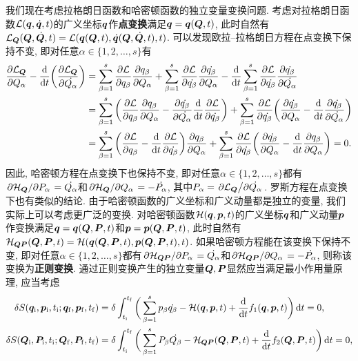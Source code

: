 我们现在考虑拉格朗日函数和哈密顿函数的独立变量变换问题. 考虑对拉格朗日函数$ \mathcal{L}(\vb*{q},\dot{\vb*{q}},t) $的广义坐标$ \vb*{q} $作\textbf{点变换}满足$ \vb*{q}=\vb*{q}(\vb*{Q},t) $, 此时自然有$ \mathcal{L}_{\vb*{Q}}(\vb*{Q},\dot{\vb*{Q}},t)=\mathcal{L}(\vb*{q}(\vb*{Q},t),\dot{\vb*{q}}(\vb*{Q},\dot{\vb*{Q}},t),t) $. 可以发现欧拉{--}拉格朗日方程在点变换下保持不变, 即对任意$ \alpha \in \{1,2,\ldots,s\} $有
\begin{align*}
    \pdv{\mathcal{L}_{\vb*{Q}}}{Q_{\alpha}} - \dv{t}(\pdv{\mathcal{L}_{\vb*{Q}}}{\dot{Q_{\alpha}}}) &= \sum_{\beta=1}^s \pdv{\mathcal{L}}{q_{\beta}}\pdv{q_{\beta}}{Q_{\alpha}} + \sum_{\beta=1}^s \pdv{\mathcal{L}}{\dot{q_{\beta}}}\pdv{\dot{q_{\beta}}}{Q_{\alpha}} - \dv{t} \sum_{\beta=1}^s \pdv{\mathcal{L}}{\dot{q_{\beta}}}\pdv{\dot{q_{\beta}}}{\dot{Q_{\alpha}}}\\
    &=\sum_{\beta=1}^s \bigg(\pdv{\mathcal{L}}{q_{\beta}}\pdv{q_{\beta}}{Q_{\alpha}} - \pdv{\dot{q_{\beta}}}{\dot{Q_{\alpha}}}\dv{t}\pdv{\mathcal{L}}{\dot{q_{\beta}}} \bigg) + \sum_{\beta=1}^s \pdv{\mathcal{L}}{\dot{q_{\beta}}} \bigg(\pdv{\dot{q_{\beta}}}{Q_{\alpha}} - \dv{t} \pdv{\dot{q_{\beta}}}{\dot{Q_{\alpha}}} \bigg)\\
    &=\sum_{\beta=1}^s \bigg(\pdv{\mathcal{L}}{q_{\beta}} - \dv{t}\pdv{\mathcal{L}}{\dot{q_{\beta}}} \bigg) \pdv{q_{\beta}}{Q_{\alpha}} + \sum_{\beta=1}^s \pdv{\mathcal{L}}{\dot{q_{\beta}}} \bigg(\pdv{\dot{q_{\beta}}}{Q_{\alpha}} - \dv{t} \pdv{q_{\beta}}{Q_{\alpha}} \bigg)=0.
\end{align*}
因此, 哈密顿方程在点变换下也保持不变, 即对任意$ \alpha \in \{1,2,\ldots,s\} $都有$ \pdv*{\mathcal{H}_{\vb*{Q}}}{P_{\alpha}} = \dot{Q_{\alpha}} $和$ \pdv*{\mathcal{H}_{\vb*{Q}}}{Q_{\alpha}} = -\dot{P_{\alpha}} $, 其中$ P_{\alpha}=\pdv*{\mathcal{L}_{\vb*{Q}}}{\dot{Q_{\alpha}}} $. 罗斯方程在点变换下也有类似的结论. 由于哈密顿函数的广义坐标和广义动量都是独立的变量, 我们实际上可以考虑更广泛的变换. 对哈密顿函数$ \mathcal{H}(\vb*{q},\vb*{p},t) $的广义坐标$ \vb*{q} $和广义动量$ \vb*{p} $作变换满足$ \vb*{q}=\vb*{q}(\vb*{Q},\vb*{P},t) $和$ \vb*{p}=\vb*{p}(\vb*{Q},\vb*{P},t) $, 此时自然有$ \mathcal{H}_{\vb*{QP}}(\vb*{Q},\vb*{P},t)=\mathcal{H}(\vb*{q}(\vb*{Q},\vb*{P},t),\vb*{p}(\vb*{Q},\vb*{P},t),t) $. 如果哈密顿方程能在该变换下保持不变, 即对任意$ \alpha \in \{1,2,\ldots,s\} $都有$ \pdv*{\mathcal{H}_{\vb*{QP}}}{P_{\alpha}} = \dot{Q_{\alpha}} $和$ \pdv*{\mathcal{H}_{\vb*{QP}}}{Q_{\alpha}} = -\dot{P_{\alpha}} $, 则称该变换为\textbf{正则变换}. 通过正则变换产生的独立变量$ \vb*{Q},\vb*{P} $显然应当满足最小作用量原理, 应当考虑
\begin{align*}
    \var{S(\vb*{q}_{\mathrm{i}},\vb*{p}_{\mathrm{i}},t_{\mathrm{i}};\vb*{q}_{\mathrm{f}},\vb*{p}_{\mathrm{f}},t_{\mathrm{f}})} &= \var{\int_{t_{\mathrm{i}}}^{t_{\mathrm{f}}} \bigg(\sum_{\beta=1}^s p_{\beta}\dot{q_{\beta}} - \mathcal{H}(\vb*{q},\vb*{p},t) + \dv{t} f_1(\vb*{q},\vb*{p},t)\bigg) \dd{t}} = 0,\\
    \var{S(\vb*{Q}_{\mathrm{i}},\vb*{P}_{\mathrm{i}},t_{\mathrm{i}};\vb*{Q}_{\mathrm{f}},\vb*{P}_{\mathrm{f}},t_{\mathrm{f}})} &= \var{\int_{t_{\mathrm{i}}}^{t_{\mathrm{f}}} \bigg(\sum_{\beta=1}^s P_{\beta}\dot{Q_{\beta}} - \mathcal{H}_{\vb*{Q}\vb*{P}}(\vb*{Q},\vb*{P},t) + \dv{t} f_2(\vb*{Q},\vb*{P},t)\bigg) \dd{t}} = 0,
\end{align*}
